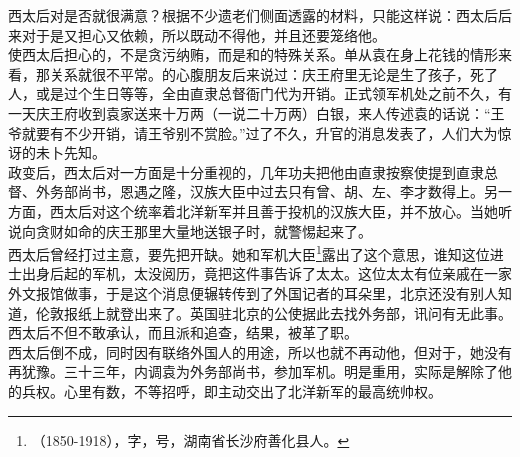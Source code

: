 西太后对是否就很满意？根据不少遗老们侧面透露的材料，只能这样说：西太后后来对于是又担心又依赖，所以既动不得他，并且还要笼络他。\\

使西太后担心的，不是贪污纳贿，而是和的特殊关系。单从袁在身上花钱的情形来看，那关系就很不平常。的心腹朋友后来说过：庆王府里无论是生了孩子，死了人，或是过个生日等等，全由直隶总督衙门代为开销。正式领军机处之前不久，有一天庆王府收到袁家送来十万两（一说二十万两）白银，来人传述袁的话说：“王爷就要有不少开销，请王爷别不赏脸。”过了不久，升官的消息发表了，人们大为惊讶的未卜先知。\\

政变后，西太后对一方面是十分重视的，几年功夫把他由直隶按察使提到直隶总督、外务部尚书，恩遇之隆，汉族大臣中过去只有曾、胡、左、李才数得上。另一方面，西太后对这个统率着北洋新军并且善于投机的汉族大臣，并不放心。当她听说向贪财如命的庆王那里大量地送银子时，就警惕起来了。\\

西太后曾经打过主意，要先把开缺。她和军机大臣\footnote{（1850-1918），字，号，湖南省长沙府善化县人。}露出了这个意思，谁知这位进士出身后起的军机，太没阅历，竟把这件事告诉了太太。这位太太有位亲戚在一家外文报馆做事，于是这个消息便辗转传到了外国记者的耳朵里，北京还没有别人知道，伦敦报纸上就登出来了。英国驻北京的公使据此去找外务部，讯问有无此事。西太后不但不敢承认，而且派和追查，结果，被革了职。\\

西太后倒不成，同时因有联络外国人的用途，所以也就不再动他，但对于，她没有再犹豫。三十三年，内调袁为外务部尚书，参加军机。明是重用，实际是解除了他的兵权。心里有数，不等招呼，即主动交出了北洋新军的最高统帅权。\\

